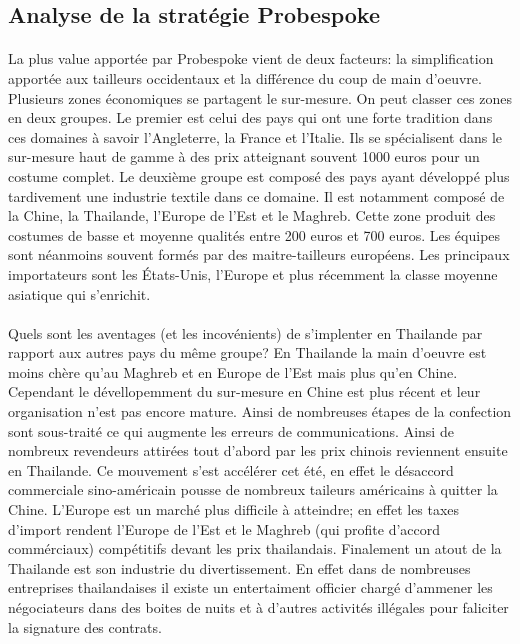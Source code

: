 \subsection{Analyse de la stratégie Probespoke}
\paragraph{}
La plus value apportée par Probespoke vient de deux facteurs: la simplification apportée aux tailleurs occidentaux et la différence du coup de main d'oeuvre. Plusieurs zones économiques se partagent le sur-mesure. On peut classer ces zones en deux groupes. Le premier est celui des pays qui ont une forte tradition dans ces domaines à savoir l'Angleterre, la France et l'Italie. Ils se spécialisent dans le sur-mesure haut de gamme à des prix atteignant souvent 1000 euros pour un costume complet. Le deuxième groupe est composé des pays ayant développé plus tardivement une industrie textile dans ce domaine. Il est notamment composé de la Chine, la Thailande, l'Europe de l'Est et le Maghreb. Cette zone produit des costumes de basse et moyenne qualités entre 200 euros et 700 euros. Les équipes sont néanmoins souvent formés par des maitre-tailleurs européens.  Les principaux importateurs sont les États-Unis, l'Europe et plus récemment la classe moyenne asiatique qui s'enrichit.
\paragraph{} Quels sont les aventages (et les incovénients) de s'implenter en Thailande par rapport aux autres pays du même groupe? En Thailande la main d'oeuvre est moins chère qu'au Maghreb et en Europe de l'Est mais plus qu'en Chine. Cependant le dévellopemment du sur-mesure en Chine est plus récent et leur organisation n'est pas encore mature. Ainsi de nombreuses étapes de la confection sont sous-traité ce qui augmente les erreurs de communications. Ainsi de nombreux revendeurs attirées tout d'abord par les prix chinois reviennent ensuite en Thailande. Ce mouvement s'est accélérer cet été, en effet le désaccord commerciale sino-américain pousse de nombreux taileurs américains à quitter la Chine. L'Europe est un marché plus difficile à atteindre; en effet les taxes d'import rendent l'Europe de l'Est et le Maghreb (qui profite d'accord commérciaux) compétitifs devant les prix thailandais. Finalement un atout de la Thailande est son industrie du divertissement. En effet dans de nombreuses entreprises thailandaises il existe un entertaiment officier chargé d'ammener les négociateurs dans des boites de nuits et à d'autres activités illégales pour faliciter la signature des contrats.
